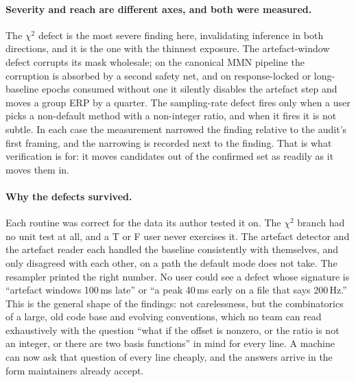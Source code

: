 \documentclass[11pt]{article}
\begin{document}
\paragraph{Severity and reach are different axes, and both were measured.} The $\chi^2$ defect is the most severe finding here, invalidating inference in both directions, and it is the one with the thinnest exposure. The artefact-window defect corrupts its mask wholesale; on the canonical MMN pipeline the corruption is absorbed by a second safety net, and on response-locked or long-baseline epochs consumed without one it silently disables the artefact step and moves a group ERP by a quarter. The sampling-rate defect fires only when a user picks a non-default method with a non-integer ratio, and when it fires it is not subtle. In each case the measurement narrowed the finding relative to the audit's first framing, and the narrowing is recorded next to the finding. That is what verification is for: it moves candidates out of the confirmed set as readily as it moves them in.

\paragraph{Why the defects survived.} Each routine was correct for the data its author tested it on. The $\chi^2$ branch had no unit test at all, and a T or F user never exercises it. The artefact detector and the artefact reader each handled the baseline consistently with themselves, and only disagreed with each other, on a path the default mode does not take. The resampler printed the right number. No user could see a defect whose signature is ``artefact windows 100\,ms late'' or ``a peak 40\,ms early on a file that says 200\,Hz.'' This is the general shape of the findings: not carelessness, but the combinatorics of a large, old code base and evolving conventions, which no team can read exhaustively with the question ``what if the offset is nonzero, or the ratio is not an integer, or there are two basis functions'' in mind for every line. A machine can now ask that question of every line cheaply, and the answers arrive in the form maintainers already accept.
\end{document}
